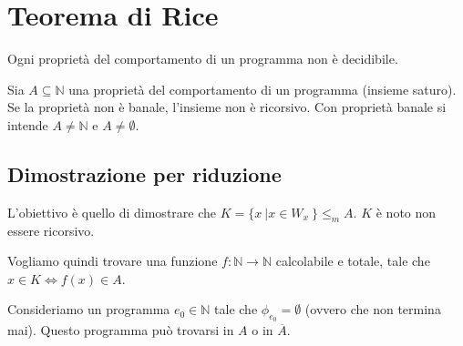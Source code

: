 \section{Teorema di Rice}

Ogni proprietà del comportamento di un programma non è decidibile.

Sia $A \subseteq \mathbb{N}$ una proprietà del comportamento di un programma (insieme saturo). Se la proprietà non è banale, l'insieme non è ricorsivo. Con proprietà banale si intende $A \neq \mathbb{N}$ e $A \neq \emptyset$. 

\subsection{Dimostrazione per riduzione}

L'obiettivo è quello di dimostrare che $K = \{ x \: | x \in W_x\: \} \leq_m A$. $K$ è noto non essere ricorsivo.

Vogliamo quindi trovare una funzione $f : \mathbb{N} \rightarrow \mathbb{N}$ calcolabile e totale, tale che $x \in K \Leftrightarrow f(x) \in A$.

Consideriamo un programma $e_0 \in \mathbb{N}$ tale che $\phi_{e_0} = \emptyset$ (ovvero che non termina mai). Questo programma può trovarsi in $A$ o in $\overline{A}$.

